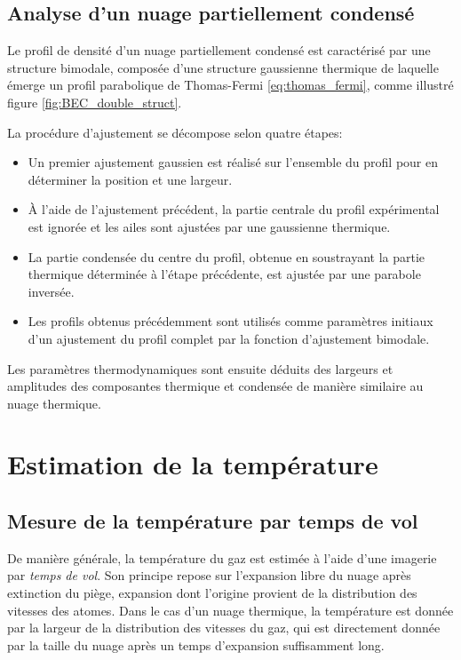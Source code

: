 \subsection{Analyse d'un nuage partiellement condensé}
Le profil de densité d'un nuage partiellement condensé est caractérisé par une structure bimodale, composée d'une structure gaussienne thermique de laquelle émerge un profil parabolique de Thomas-Fermi \ref{eq:thomas_fermi}, comme illustré figure \ref{fig:BEC_double_struct}.

La procédure d'ajustement se décompose selon quatre étapes:
\begin{itemize}
\item[\textendash] Un premier ajustement gaussien est réalisé sur l'ensemble du profil pour en déterminer la position et une largeur.
\item[\textendash] À l'aide de l'ajustement précédent, la partie centrale du profil expérimental est ignorée et les ailes sont ajustées par une gaussienne thermique.
\item[\textendash] La partie condensée du centre du profil, obtenue en soustrayant la partie thermique déterminée à l'étape précédente, est ajustée par une parabole inversée.
\item[\textendash] Les profils obtenus précédemment sont utilisés comme paramètres initiaux d'un ajustement du profil complet par la fonction d'ajustement bimodale.
\end{itemize}

Les paramètres thermodynamiques sont ensuite déduits des largeurs et amplitudes des composantes thermique et condensée de manière similaire au nuage thermique.









\section{Estimation de la température}
\subsection{Mesure de la température par temps de vol}
De manière générale, la température du gaz est estimée à l'aide d'une imagerie par \emph{temps de vol}. Son principe repose sur l'expansion libre du nuage après extinction du piège, expansion dont l'origine provient de la distribution des vitesses des atomes. Dans le cas d'un nuage thermique, la température est donnée par la largeur de la distribution des vitesses du gaz, qui est directement donnée par la taille du nuage après un temps d'expansion suffisamment long.

